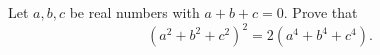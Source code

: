 Let $a,b,c$ be real numbers with $a+b+c=0$. Prove that
\[
\left(a^2+b^2+c^2\right)^2=2\left(a^4+b^4+c^4\right).
\]
